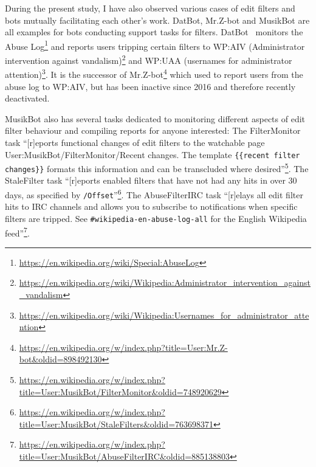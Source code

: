 During the present study, I have also observed various cases of edit filters and bots mutually facilitating each other's work.
DatBot, Mr.Z-bot and MusikBot are all examples for bots conducting support tasks for filters.
DatBot~\cite{Wikipedia:DatBot} monitors the Abuse Log\footnote{\url{https://en.wikipedia.org/wiki/Special:AbuseLog}}
and reports users tripping certain filters to WP:AIV (Administrator intervention against vandalism)\footnote{\url{https://en.wikipedia.org/wiki/Wikipedia:Administrator_intervention_against_vandalism}} and WP:UAA (usernames for administrator attention)\footnote{\url{https://en.wikipedia.org/wiki/Wikipedia:Usernames_for_administrator_attention}}.
It is the successor of Mr.Z-bot\footnote{\url{https://en.wikipedia.org/w/index.php?title=User:Mr.Z-bot&oldid=898492130}}
which used to report users from the abuse log to WP:AIV, but has been inactive since 2016 and therefore recently deactivated.

MusikBot also has several tasks dedicated to monitoring different aspects of edit filter behaviour and compiling reports for anyone interested:
The FilterMonitor task ``[r]eports functional changes of edit filters to the watchable page User:MusikBot/FilterMonitor/Recent changes. The template \verb|{{recent filter changes}}| formats this information and can be transcluded where desired''\footnote{\url{https://en.wikipedia.org/w/index.php?title=User:MusikBot/FilterMonitor&oldid=748920629}}.
The StaleFilter task ``[r]eports enabled filters that have not had any hits in over 30 days, as specified by \verb|/Offset|''\footnote{\url{https://en.wikipedia.org/w/index.php?title=User:MusikBot/StaleFilters&oldid=763698371}}.
The AbuseFilterIRC task ``[r]elays all edit filter hits to IRC channels and allows you to subscribe to notifications when specific filters are tripped. See \verb|#wikipedia-en-abuse-log-all| for the English Wikipedia feed''\footnote{\url{https://en.wikipedia.org/w/index.php?title=User:MusikBot/AbuseFilterIRC&oldid=885138803}}.

